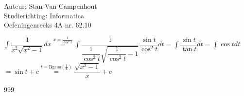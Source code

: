 \documentclass[a4paper]{article}
\begin{document}
  
\noindent \large Auteur: Stan Van Campenhout \\
\noindent \large Studierichting:  Informatica\\
\noindent \large Oefeningenreeks 4A nr. 62.10\\

\medskip

\normalsize

$ \displaystyle\int\dfrac{1}{x^2\sqrt{x^2-1}}dx\stackrel{x = \tfrac{1}{\cos^2t}}{=} \displaystyle\int\dfrac{1}{\dfrac{1}{\cos^2t}\sqrt{\dfrac{1}{\cos^2t}-1}}\dfrac{\sin t}{\cos^2t}dt 
= \displaystyle\int\dfrac{\sin t}{\tan t}dt =\displaystyle\int\cos tdt $\\

$ = \sin t +c \stackrel{t = \operatorname{Bgcos\left(\tfrac{1}{x}\right)}}{=} \dfrac{\sqrt{x^2-1}}{x} + c $\\

\begin{thebibliography}{999}
\end{thebibliography}
\end{document}
